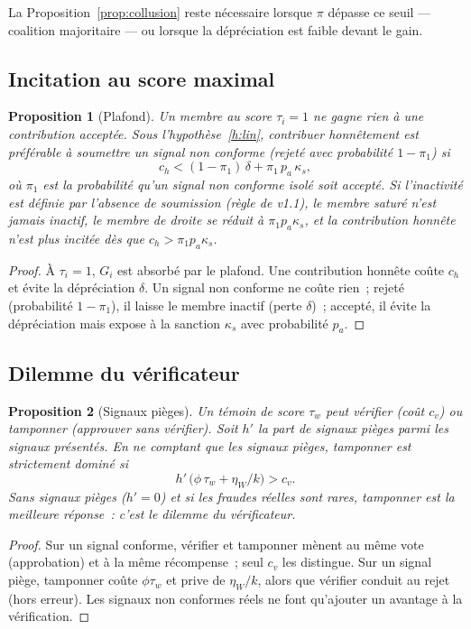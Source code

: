 \documentclass[11pt,a4paper]{article}
\theoremstyle{plain}
\newtheorem{proposition}{Proposition}
\theoremstyle{definition}
\theoremstyle{remark}
\newcommand{\1}{\mathbf{1}}
\begin{document}
La Proposition~\ref{prop:collusion} reste nécessaire lorsque $\pi$ dépasse ce
seuil --- coalition majoritaire --- ou lorsque la dépréciation est faible devant
le gain.

\subsection{Incitation au score maximal}

\begin{proposition}[Plafond]\label{prop:plafond}
Un membre au score $\tau_i=1$ ne gagne rien à une contribution acceptée. Sous
l'hypothèse~\ref{h:lin}, contribuer honnêtement est préférable à soumettre un
signal non conforme (rejeté avec probabilité $1-\pi_1$) si
\begin{equation}
c_h<(1-\pi_1)\,\delta+\pi_1\,p_a\,\kappa_s,
\label{eq:plafond}
\end{equation}
où $\pi_1$ est la probabilité qu'un signal non conforme isolé soit accepté.
Si l'inactivité est définie par l'absence de \emph{soumission} (règle de v1.1),
le membre saturé n'est jamais inactif, le membre de droite se réduit à
$\pi_1 p_a\kappa_s$, et la contribution honnête n'est plus incitée dès que
$c_h>\pi_1p_a\kappa_s$.
\end{proposition}
\begin{proof}
À $\tau_i=1$, $G_i$ est absorbé par le plafond. Une contribution honnête coûte
$c_h$ et évite la dépréciation $\delta$. Un signal non conforme ne coûte rien~;
rejeté (probabilité $1-\pi_1$), il laisse le membre inactif (perte $\delta$)~;
accepté, il évite la dépréciation mais expose à la sanction $\kappa_s$ avec
probabilité $p_a$.
\end{proof}

\subsection{Dilemme du vérificateur}

\begin{proposition}[Signaux pièges]\label{prop:verif}
Un témoin de score $\tau_w$ peut \emph{vérifier} (coût $c_v$) ou
\emph{tamponner} (approuver sans vérifier). Soit $h'$ la part de signaux pièges
parmi les signaux présentés. En ne comptant que les signaux pièges, tamponner
est strictement dominé si
\begin{equation}
h'\,\bigl(\phi\,\tau_w+\eta_W/k\bigr)>c_v.
\label{eq:verif}
\end{equation}
Sans signaux pièges ($h'=0$) et si les fraudes réelles sont rares,
tamponner est la meilleure réponse~: c'est le dilemme du vérificateur.
\end{proposition}
\begin{proof}
Sur un signal conforme, vérifier et tamponner mènent au même vote
(approbation) et à la même récompense~; seul $c_v$ les distingue. Sur un
signal piège, tamponner coûte $\phi\tau_w$ et prive de $\eta_W/k$, alors que
vérifier conduit au rejet (hors erreur). Les signaux non conformes réels ne
font qu'ajouter un avantage à la vérification.
\end{proof}
\end{document}
